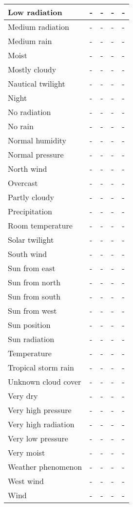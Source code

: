 \begin{longtable}{|p{}|p{}|p{}|p{}|p{}|}
  \hline
  Low radiation & - & - & - & - \\
  \hline
  Medium radiation & - & - & - & - \\
  \hline
  Medium rain & - & - & - & - \\
  \hline
  Moist & - & - & - & - \\
  \hline
  Mostly cloudy & - & - & - & - \\
  \hline
  Nautical twilight & - & - & - & - \\
  \hline
  Night & - & - & - & - \\
  \hline
  No radiation & - & - & - & - \\
  \hline
  No rain & - & - & - & - \\
  \hline
  Normal humidity & - & - & - & - \\
  \hline
  Normal pressure & - & - & - & - \\
  \hline
  North wind & - & - & - & - \\
  \hline
  Overcast & - & - & - & - \\
  \hline
  Partly cloudy & - & - & - & - \\
  \hline
  Precipitation & - & - & - & - \\
  \hline
  Room temperature & - & - & - & - \\
  \hline
  Solar twilight & - & - & - & - \\
  \hline
  South wind & - & - & - & - \\
  \hline
  Sun from east & - & - & - & - \\
  \hline
  Sun from north & - & - & - & - \\
  \hline
  Sun from south & - & - & - & - \\
  \hline
  Sun from west & - & - & - & - \\
  \hline
  Sun position & - & - & - & - \\
  \hline
  Sun radiation & - & - & - & - \\
  \hline
  Temperature & - & - & - & - \\
  \hline
  Tropical storm rain & - & - & - & - \\
  \hline
  Unknown cloud cover & - & - & - & - \\
  \hline
  Very dry & - & - & - & - \\
  \hline
  Very high pressure & - & - & - & - \\
  \hline
  Very high radiation & - & - & - & - \\
  \hline
  Very low pressure & - & - & - & - \\
  \hline
  Very moist & - & - & - & - \\
  \hline
  Weather phenomenon & - & - & - & - \\
  \hline
  West wind & - & - & - & - \\
  \hline
  Wind & - & - & - & - \\
  \hline
\end{longtable}


